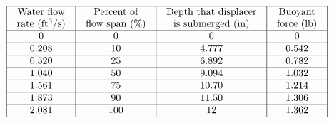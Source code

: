 

$$\vbox{\offinterlineskip
\halign{\strut
\vrule \quad\hfil # \ \hfil & 
\vrule \quad\hfil # \ \hfil & 
\vrule \quad\hfil # \ \hfil & 
\vrule \quad\hfil # \ \hfil \vrule \cr
\noalign{\hrule}
%
Water flow & Percent of & Depth that displacer & Buoyant \cr
%
rate (ft$^{3}$/s) & flow span (\%) & is submerged (in) & force (lb) \cr
%
\noalign{\hrule}
%
0 & 0 & 0 & 0 \cr
%
\noalign{\hrule}
%
0.208 & 10 & 4.777 & 0.542 \cr
%
\noalign{\hrule}
%
0.520 & 25 & 6.892 & 0.782 \cr
%
\noalign{\hrule}
%
1.040 & 50 & 9.094 & 1.032 \cr
%
\noalign{\hrule}
%
1.561 & 75 & 10.70 & 1.214 \cr
%
\noalign{\hrule}
%
1.873 & 90 & 11.50 & 1.306 \cr
%
\noalign{\hrule}
%
2.081 & 100 & 12 & 1.362 \cr
%
\noalign{\hrule}
} %
}$$ %











